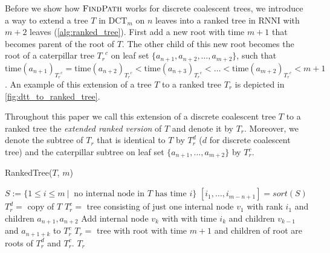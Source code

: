 \documentclass[11pt]{amsart}
\newcommand{\rnni}{\mathrm{RNNI}}
\newcommand{\findpath}{\textsc{FindPath}}
\newcommand{\ntime}{\mathrm{time}}
\newcommand{\dct}{\mathrm{DCT}}
\newcommand{\summary}[1]{} %
\begin{document}
\summary{How to add leaves to a $\dct_m$ tree to transform it into a ranked tree}
Before we show how $\findpath$ works for discrete coalescent trees, we introduce a way to extend a tree $T$ in $\dct_m$ on $n$ leaves into a ranked tree in $\rnni$ with $m+2$ leaves (\autoref{alg:ranked_tree}).
First add a new root with time $m + 1$ that becomes parent of the root of $T$.
The other child of this new root becomes the root of a caterpillar tree ${T_r}^c$ on leaf set $\{a_{n+1}, a_{n+2}, \ldots, a_{m+2}\}$, such that $\ntime(a_{n+1})_{{T_r}^c} = \ntime(a_{n+2})_{{T_r}^c} < \ntime(a_{n+3})_{{T_r}^c} < \ldots < \ntime(a_{m+2})_{{T_r}^c} < m+1$.
An example of this extension of a tree $T$ to a ranked tree $T_r$ is depicted in \autoref{fig:dtt_to_ranked_tree}.

Throughout this paper we call this extension of a discrete coalescent tree $T$ to a ranked tree the \emph{extended ranked version} of $T$ and denote it by $T_r$.
Moreover, we denote the subtree of $T_r$ that is identical to $T$ by $T_r^d$ ($d$ for discrete coalescent tree) and the caterpillar subtree on leaf set $\{a_{n+1}, \ldots, a_{m+2}\}$ by $T_r^c$.

\begin{algorithm}[ht]
	\caption{RankedTree($T$, $m$)}
	\label{alg:ranked_tree}
	\begin{algorithmic}[1]
		\STATE $S:= \{1 \leq i \leq m \ |\  \text{ no internal node in } T \text{ has time } i\}$
		\STATE $[i_1, \ldots, i_{m-n+1}] = sort(S)$
		\STATE $T_r^d =$ copy of $T$
		\STATE $T_r^c =$ tree consisting of just one internal node $v_1$ with rank $i_1$ and children $a_{n+1}, a_{n+2}$
			\STATE Add internal node $v_k$ with with time $i_k$ and children $v_{k-1}$ and $a_{n+1+k}$ to $T_r^c$
		\ENDFOR
		\STATE $T_r = $ tree with root with time $m+1$ and children of root are roots of $T_r^d$ and $T_r^c$.
		\RETURN $T_r$
	\end{algorithmic}
\end{algorithm}
\end{document}
